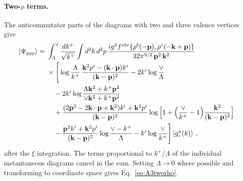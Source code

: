 \paragraph{Two-$\rho$ terms.} The anticommutator parts of the diagrams with two and three valence vertices give
\begin{align}\label{eq:Psigrhorho}
\ket{\Psi_{g\rho\rho}}=\ &\int_\Lambda^\vee\frac{dk^+}{\sqrt{k^+}}\int d^2k\,d^2p\,\frac{ig^3f^{abc}\{\rho^b(-\v p),\rho^c(-\v k+\v p)\}}{32\pi^{9/2}\,\v p^2\,\v k^2}\notag\\&\times\Bigg[\log\frac{\Lambda}{k^+}\,\frac{\v k^2p^i-(\v k\cdot\v p)k^i}{(\v k-\v p)^2}-2k^i\log\frac{\vee}{\Lambda}\notag\\&\quad-2k^i\log\frac{\Lambda\v k^2+k^+\v p^2}{\vee\v k^2+k^+\v p^2}
\notag\\&\quad
+\frac{(2\v p^2-2\v k\cdot\v p+\v k^2)k^i+\v k^2p^i}{(\v k-\v p)^2}\log\Big[1+\Big(\frac{\vee}{k^+}-1\Big)\frac{\v k^2}{(\v k-\v p)^2}\Big]
\notag\\&\quad
-\frac{\v p^2k^i+\v k^2p^i}{(\v k-\v p)^2}\log\frac{\vee-k^+}{\Lambda}-k^i\log\frac{\vee}{k^+}\Bigg]\ket{g^a_i(k)}\,,
\end{align}
after the $\xi$ integration. The terms proportional to $k^+/\Lambda$ of the individual instantaneous diagrams cancel in the sum. Setting $\Lambda\to0$ where possible and transforming to coordinate space gives Eq.~\eqref{eq:A3tworho}.


